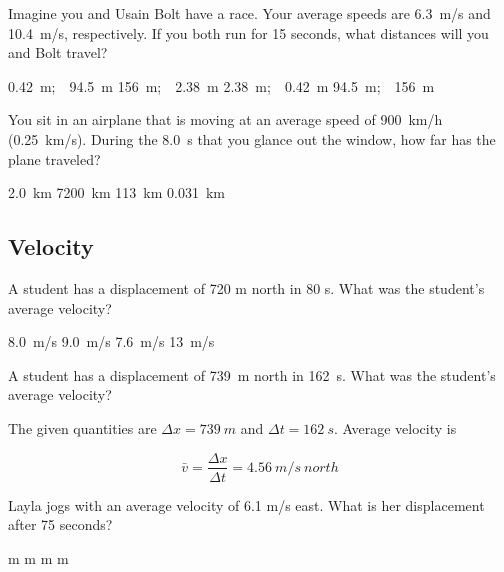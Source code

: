 \documentclass[answers]{exam}
\begin{document}
\begin{questions}
\begin{questions}
\question
Imagine you and Usain Bolt have a race. Your average speeds are \SI{6.3}{m/s} and \SI{10.4}{m/s}, respectively. If you both run for 15 seconds, what distances will you and Bolt travel?

\begin{choices}
    \choice  \SI{0.42}{m};\ \ \SI{94.5}{m}
    \choice  \SI{156}{m};\ \ \SI{2.38}{m}
    \choice  \SI{2.38}{m};\ \ \SI{0.42}{m}
    \correctchoice \SI{94.5}{m};\ \ \SI{156}{m} 
\end{choices}

\question %
You sit in an airplane that is moving at an average speed of 
\SI{900}{km/h} (\SI{0.25}{km/s}). During the \SI{8.0}{s}
that you glance out the window, how far has the plane traveled?

\begin{choices}
\CorrectChoice \SI{2.0}{km}
\choice \SI{7200}{km}
\choice \SI{113}{km}
\choice \SI{0.031}{km}
\end{choices}


\subsection*{Velocity}
\question %
A student has a displacement of 720 m north in 80 s. What was the student's average velocity?

\begin{choices}
\choice \SI{8.0}{m/s}
\CorrectChoice \SI{9.0}{m/s}
\choice \SI{7.6}{m/s}
\choice \SI{13}{m/s}
\end{choices}


\question
A student has a displacement of \SI{739}{m} north in \SI{162}{s}. What was the student's average velocity?

\begin{solution}
    The given quantities are $\Delta{x} = \SI{739}{m}$ and $\Delta{t} = \SI{162}{s}$. Average velocity is

\begin{equation*}
        \bar{v} = \frac{\Delta{x}}{\Delta{t}} = \SI{4.56}{m/s\ north}
\end{equation*}
\end{solution}



\question %
Layla jogs with an average velocity of 6.1 m/s east. What is her displacement after 75 seconds?

\begin{choices}
 m
 m
 m
 m
\end{choices}



\end{questions}
\end{questions}
\end{document}
